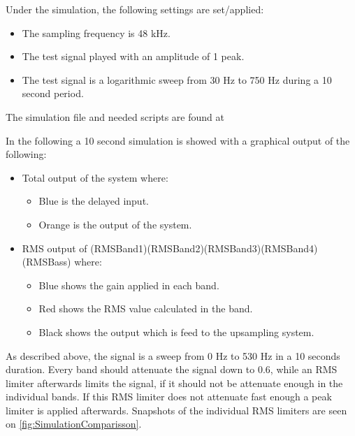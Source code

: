 Under the simulation, the following settings are set/applied:
\begin{itemize}
\item The sampling frequency is 48 kHz.
\item The test signal played with an amplitude of 1 peak.
\item The test signal is a logarithmic sweep from 30 Hz to 750 Hz during a 10 second period.
\end{itemize}

The simulation file and needed scripts are found at 


In the following a 10 second simulation is showed with a graphical output of the following:
\begin{itemize}
\item Total output of the system where:
\begin{itemize}
\item Blue is the delayed input.
\item Orange is the output of the system.
\end{itemize}
\item RMS output of (RMSBand1)(RMSBand2)(RMSBand3)(RMSBand4)(RMSBass) where:
\begin{itemize}
\item Blue shows the gain applied in each band.
\item Red shows the RMS value calculated in the band.
\item Black shows the output which is feed to the upsampling system.
\end{itemize} 
\end{itemize}

As described above, the signal is a sweep from 0 Hz to 530 Hz in a 10 seconds duration. Every band should attenuate the signal down to 0.6, while an RMS limiter afterwards limits the signal, if it should not be attenuate enough in the individual bands. If this RMS limiter does not attenuate fast enough a peak limiter is applied afterwards. Snapshots of the individual RMS limiters are seen on \autoref{fig:SimulationComparisson}.    

